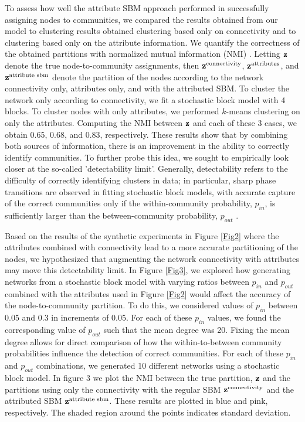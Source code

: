 \documentclass[10pt,journal,compsoc]{IEEEtran}
\begin{document}
To assess how well the attribute SBM approach performed in successfully assigning nodes to communities, we compared the results obtained from our model to clustering results obtained clustering based only on connectivity and to clustering based only on the attribute information. We quantify the correctness of the obtained partitions with normalized mutual information (NMI) \cite{commdeccompare}. Letting ${\bf z}$ denote the true node-to-community assignments, then ${\bf z}^{\text{connectivity}}$, ${\bf z}^{\text{attributes}}$, and ${\bf z}^{\text{attribute sbm}}$ denote the partition of the nodes according to the network connectivity only, attributes only, and with the attributed SBM. To cluster the network only according to connectivity, we fit a stochastic block model with 4 blocks. To cluster nodes with only attributes, we performed $k$-means clustering on only the attributes. Computing the NMI between ${\bf z}$ and each of these 3 cases, we obtain 0.65, 0.68, and 0.83, respectively. 
These results show that by combining both sources of information, there is an improvement in the ability to correctly identify communities. To further probe this idea, we sought to empirically look closer at the so-called 'detectability limit'. Generally, detectability refers to the difficulty of correctly identifying clusters in data; in particular, sharp phase transitions are observed in fitting stochastic block models, with accurate capture of the correct communities only if the within-community probability, $p_{in}$, is sufficiently larger than the between-community probability, $p_{out}$ \cite{decelle,taylor}. 

Based on the results of the synthetic experiments in Figure \ref{Fig2} where the attributes combined with connectivity lead to a more accurate partitioning of the nodes, we hypothesized that augmenting the network connectivity with attributes may move this detectability limit. In Figure \ref{Fig3}, we explored how generating networks from a stochastic block model with varying ratios between $p_{in}$ and $p_{out}$ combined with the attributes used in Figure \ref{Fig2} would affect the accuracy of the node-to-community partition. To do this, we considered values of $p_{in}$ between 0.05 and 0.3 in increments of 0.05. For each of these $p_{in}$ values, we found the corresponding value of $p_{out}$ such that the mean degree was 20. Fixing the mean degree allows for direct comparison of how the within-to-between community probabilities influence the detection of correct communities. For each of these $p_{in}$ and $p_{out}$ combinations, we generated 10 different networks using a stochastic block model. In figure 3 we plot the NMI between the true partition, ${\bf z}$ and the partitions using only the connectivity with the regular SBM ${\bf z}^{\text{connectivity}}$ and the attributed SBM ${\bf z}^{\text{attribute sbm}}$. These results are plotted in blue and pink, respectively. The shaded region around the points indicates standard deviation. 
\end{document}
